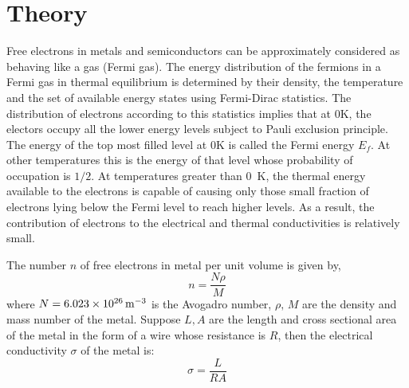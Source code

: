 	\section{Theory}
	Free electrons in metals and semiconductors can be approximately considered as behaving like a gas (Fermi gas). The energy distribution of the fermions in a Fermi gas in thermal equilibrium is determined by their density, the temperature and the set of available energy states using Fermi-Dirac statistics. The distribution of electrons according to this statistics implies that at 0K, the electors occupy all the lower energy levels subject to Pauli exclusion principle. The energy of the top most filled level at 0K is called the Fermi energy $E_{f}$. At other temperatures this is the energy of that level whose probability of occupation is $1/2$. At temperatures greater than \SI{0}{\kelvin}, the thermal energy available to the electrons is capable of causing only those small fraction of electrons lying below the Fermi level to reach higher levels. As a result, the contribution of electrons to the electrical and thermal conductivities is relatively small.
	
	The number $n$ of free electrons in metal per unit volume is given by, 
	\begin{equation}\label{eqn:n}
		n=\dfrac{N \rho}{M}
	\end{equation}
	where $N = \SI{6.023E26}{\per\meter\cubed}$ is the Avogadro number, $\rho,\, M$ are the density and mass number of the metal. Suppose $L, A$ are the length and cross sectional area of the metal in the form of a wire whose resistance is $R$, then the electrical conductivity $\sigma$ of the metal is:
	\begin{equation}\label{eqn:sigma-1}
		\sigma=\dfrac{L}{RA}
	\end{equation}


